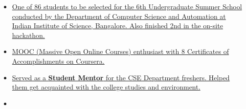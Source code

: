 \documentclass[10pt,a4paper]{article}
\begin{document}
\spacedhrule{0.5em}{-0.4em}

\vspace{0.15cm}
\begin{itemize}[labelindent=1.5em,labelsep=-0.3cm,leftmargin=*]

\item \headedsubsection 
{\href{}{\normalfont One of 86 students to be selected for the 6th Undergraduate Summer School conducted by the Department of Computer Science and Automation at
Indian Institute of Science, Bangalore. Also finished 2nd in the on-site hackathon. 
}}{{{}}}


\item \headedsubsection 
{\href{}{\normalfont MOOC (Massive Open Online Courses) enthusiast with 8 Certificates of Accomplishments on Coursera.
}}{{{}}}

\item \headedsubsection 
{\href{}{\normalfont Served as a \textbf{Student Mentor} for the CSE Department freshers. Helped them get acquainted
with the college studies and environment.
}}{{{}}}

\item {}

\end{itemize}
\end{document}
